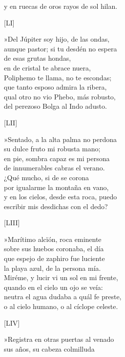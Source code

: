 \documentclass[11pt,a4paper,twoside]{article}
\begin{document}
y en ruecas de oros rayos de sol hilan.\pend
\begin{center}
	[LI]
\end{center}\pstart
»Del Júpiter soy hijo, de las ondas,\\
aunque pastor; si tu desdén no espera\\
 de esas grutas hondas,\\
en  de cristal te abrace nuera,\\
Poliphemo te llama, no te escondas;\\
que tanto esposo admira la ribera,\\
qual otro no vio Phebo, más robusto,\\
del perezoso Bolga al Indo adusto.\pend 
\begin{center}
	[LII]
\end{center}\pstart
»Sentado, a la alta palma no perdona\\
su dulce fruto mi robusta mano;\\
en pie, sombra capaz es mi persona\\
de innumerables cabras el verano.\\
¿Qué mucho, si de  se corona\\
por igualarme la montaña en vano,\\
y en los cielos, desde esta roca, puedo\\
escribir mis desdichas con el dedo?\pend
\begin{center}
	[LIII]
\end{center}\pstart
»Marítimo alcïón, roca eminente\\
sobre sus huebos coronaba, el día\\
que espejo de zaphiro fue luciente\\
la playa azul, de la persona mía.\\
Miréme, y lucir vi un sol en mi frente,\\
quando en el cielo un ojo se veía:\\
neutra el agua dudaba a quál fe preste,\\
o al cielo humano, o al cíclope celeste.\pend
\begin{center}
	[LIV]
\end{center}\pstart
»Registra en otras puertas al venado\\
sus años, su cabeza colmilluda\\
\end{document}
